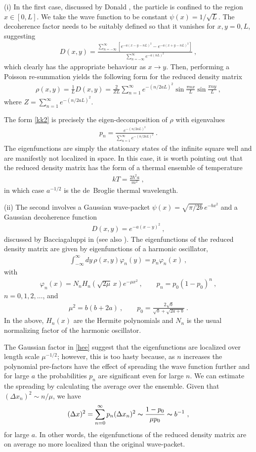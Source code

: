 \documentclass[12pt]{article}
\newcommand{\EQ}[1]{\begin{equation}\begin{split} #1
\end{split}\end{equation}}
\begin{document}
(i) In the first case, discussed by Donald \cite{Donald1}, the particle is confined to the region $x\in[0,L]$. We take the wave function
to be constant $\psi(x)=1/\sqrt{L}$. The decoherence factor needs to be suitably defined 
so that it vanishes for $x,y=0,L$, suggesting
\EQ{
D(x,y)=\frac{\sum_{n=-\infty}^\infty\left[e^{-a(x-y-nL)^2}-e^{-a(x+y-nL)^2}\right]}
{\sum_{n=-\infty}^\infty e^{-a(nL)^2}}\ ,
}
which clearly has the appropriate behaviour as $x\to y$. Then, performing a Poisson re-summation yields the following form for the reduced density matrix
\EQ{
\rho(x,y)=\frac1LD(x,y)=\frac2{ZL}\sum_{n=1}^\infty e^{-(n/2aL)^2}\sin\frac{\pi nx}L\sin\frac{\pi ny}L\ ,
\label{kk2}
}
where $Z=\sum_{n=1}^\infty e^{-(n/2aL)^2}$. 

The form \eqref{kk2} is precisely the eigen-decomposition of $\rho$ with eigenvalues
\EQ{
p_n=\frac{e^{-(n/2aL)^2}}{\sum_{n=1}^\infty e^{-(n/2aL)^2}}\ .
}
The eigenfunctions are simply the stationary states of the infinite square well and are manifestly not localized in space.
In this case, it is worth pointing out that the reduced density matrix has the form of a thermal ensemble of temperature
\EQ{
kT=\frac{2\hbar^2a}{m^2}\ ,
}
in which case $a^{-1/2}$ is the de~Broglie thermal wavelength.

(ii) The second involves a Gaussian wave-packet $\psi(x)=\sqrt{\pi/2b}\,e^{-bx^2}$ and a Gaussian decoherence function
\EQ{
D(x,y)=e^{-a(x-y)^2}\ ,
}
discussed by Bacciagaluppi in \cite{B2} (see also \cite{Barvinsky:1995va}).
The eigenfunctions of the reduced density matrix are given by eigenfunctions of a harmonic oscillator,
\EQ{
\int_{-\infty}^\infty dy\,\rho(x,y)\varphi_n(y)=p_n\varphi_n(x)\ ,
}
with
\EQ{
\varphi_n(x)=N_nH_n(\sqrt{2\mu}\, x)e^{-\mu x^2}\ ,\qquad p_n=p_0(1-p_0)^n\ ,
\label{hee}
}
$n=0,1,2,\ldots$, and
\EQ{
\mu^2=b(b+2a)\ ,\qquad p_0=\frac{2\sqrt{b}}{\sqrt{b}+\sqrt{2a+b}}\ .
}
In the above, $H_n(x)$ are the Hermite polynomials and $N_n$ is the usual normalizing factor of the harmonic oscillator.

The Gaussian factor in \eqref{hee} suggest that the eigenfunctions are localized over length scale $\mu^{-1/2}$; however, this is too hasty because, as $n$ increases the polynomial pre-factors have the effect of spreading the wave function further and for large $a$ the probabilities $p_n$ are significant even for large $n$. We can estimate the spreading by calculating the average over the ensemble. Given that $(\Delta x_n)^2\sim n/\mu$, we have
\EQ{
(\Delta x)^2=\sum_{n=0}^\infty p_n(\Delta x_n)^2\thicksim\frac{1-p_0}{\mu p_0}\thicksim b^{-1}\ ,
}
for large $a$. In other words, the eigenfunctions of the reduced density matrix are on average no more localized than the original wave-packet.
\end{document}
